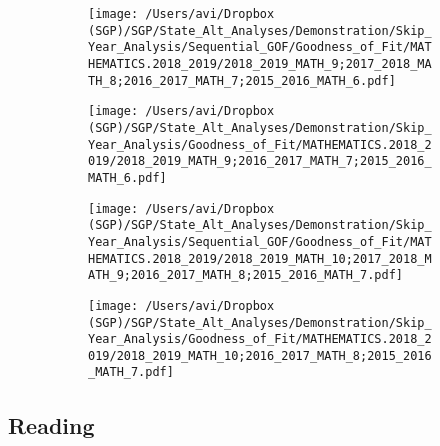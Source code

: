 \documentclass[12pt]{article}
\begin{document}
\begin{figure}[H]
\caption*{{{\bf{Figure A4:}} } Sequential (left) and skip-year (right) fit plots for Math (grades 9 - 10)}
  \begin{subfigure}[b]{0.5\textwidth}
    \texttt{[image: /Users/avi/Dropbox (SGP)/SGP/State\_Alt\_Analyses/Demonstration/Skip\_Year\_Analysis/Sequential\_GOF/Goodness\_of\_Fit/MATHEMATICS.2018\_2019/2018\_2019\_MATH\_9;2017\_2018\_MATH\_8;2016\_2017\_MATH\_7;2015\_2016\_MATH\_6.pdf]}
  \end{subfigure}
  \begin{subfigure}[b]{0.5\textwidth}
    \texttt{[image: /Users/avi/Dropbox (SGP)/SGP/State\_Alt\_Analyses/Demonstration/Skip\_Year\_Analysis/Goodness\_of\_Fit/MATHEMATICS.2018\_2019/2018\_2019\_MATH\_9;2016\_2017\_MATH\_7;2015\_2016\_MATH\_6.pdf]}
  \end{subfigure}
  \begin{subfigure}[b]{0.5\textwidth}
    \texttt{[image: /Users/avi/Dropbox (SGP)/SGP/State\_Alt\_Analyses/Demonstration/Skip\_Year\_Analysis/Sequential\_GOF/Goodness\_of\_Fit/MATHEMATICS.2018\_2019/2018\_2019\_MATH\_10;2017\_2018\_MATH\_9;2016\_2017\_MATH\_8;2015\_2016\_MATH\_7.pdf]}
  \end{subfigure}
  \begin{subfigure}[b]{0.5\textwidth}
    \texttt{[image: /Users/avi/Dropbox (SGP)/SGP/State\_Alt\_Analyses/Demonstration/Skip\_Year\_Analysis/Goodness\_of\_Fit/MATHEMATICS.2018\_2019/2018\_2019\_MATH\_10;2016\_2017\_MATH\_8;2015\_2016\_MATH\_7.pdf]}
  \end{subfigure}
\end{figure}

\hypertarget{reading}{%
\subsection{Reading}\label{reading}}
\end{document}
